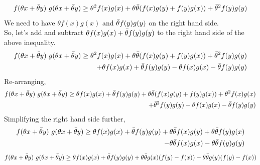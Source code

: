 \documentclass[12pt, draftcls, onecolumn]{IEEEtran}
\begin{document}
\begin{enumerate}
\begin{equation*}
    \end{equation*}
    \begin{equation*}
        f(\theta x+\Bar{\theta} y)\ g(\theta x+\Bar{\theta} y) \geq \theta^2 f(x)g(x) + \theta \Bar{\theta} (f(x)g(y) + f(y)g(x)) + \Bar{\theta}^2 f(y)g(y)
    \end{equation*}
    We need to have $\theta f(x)g(x)$ and $\Bar{\theta} f(y)g(y)$ on the right hand side.
    \\So, let's add and subtract $\theta f(x)g(x) + \Bar{\theta} f(y)g(y)$ to the right hand side of the above inequality.
    \begin{equation*}
        \begin{aligned}
            f(\theta x+\Bar{\theta} y)\ g(\theta x+\Bar{\theta} y) \geq \theta^2 f(x)g(x) + \theta \Bar{\theta} (f(x)g(y) + f(y)g(x)) + \Bar{\theta}^2 f(y)g(y) \\+ \theta f(x)g(x) + \Bar{\theta} f(y)g(y) - \theta f(x)g(x) - \Bar{\theta} f(y)g(y)
        \end{aligned}
    \end{equation*}
    Re-arranging,
    \begin{equation*}
        \begin{aligned}
            f(\theta x+\Bar{\theta} y)\ g(\theta x+\Bar{\theta} y) \geq \theta f(x)g(x) + \Bar{\theta} f(y)g(y) + \theta \Bar{\theta} (f(x)g(y) + f(y)g(x)) + \theta^2 f(x)g(x) \\+ \Bar{\theta}^2 f(y)g(y) - \theta f(x)g(x) - \Bar{\theta} f(y)g(y)
        \end{aligned}
    \end{equation*}
    Simplifying the right hand side further,
    \begin{equation*}
        \begin{aligned}
            f(\theta x+\Bar{\theta} y)\ g(\theta x+\Bar{\theta} y) \geq \theta f(x)g(x) + \Bar{\theta} f(y)g(y) + \theta \Bar{\theta} f(x)g(y) + \theta \Bar{\theta} f(y)g(x) \\- \theta \Bar{\theta} f(x)g(x) - \theta \Bar{\theta} f(y)g(y)
        \end{aligned}
    \end{equation*}
    \begin{equation*}
        \begin{aligned}
            f(\theta x+\Bar{\theta} y)\ g(\theta x+\Bar{\theta} y) \geq \theta f(x)g(x) + \Bar{\theta} f(y)g(y) + \theta \Bar{\theta} g(x)(f(y)-f(x)) - \theta \Bar{\theta} g(y)(f(y)-f(x))
        \end{aligned}

\end{equation*}
\end{enumerate}
\end{document}
